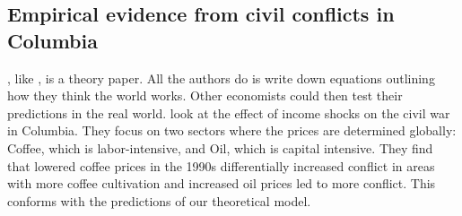 \subsection*{Empirical evidence from civil conflicts in Columbia}
\citet{dalbodalbo}, like \citet{war}, is a theory paper. All the authors do is write down equations outlining how they think the world works. Other economists could then test their predictions in the real world. \citet{dube2013commodity} look at the effect of income shocks on the civil war in Columbia. They focus on two sectors where the prices are determined globally: Coffee, which is labor-intensive, and Oil, which is capital intensive. They find that lowered coffee prices in the 1990s differentially increased conflict in areas with more coffee cultivation and increased oil prices led to more conflict. This conforms with the predictions of our theoretical model. 




